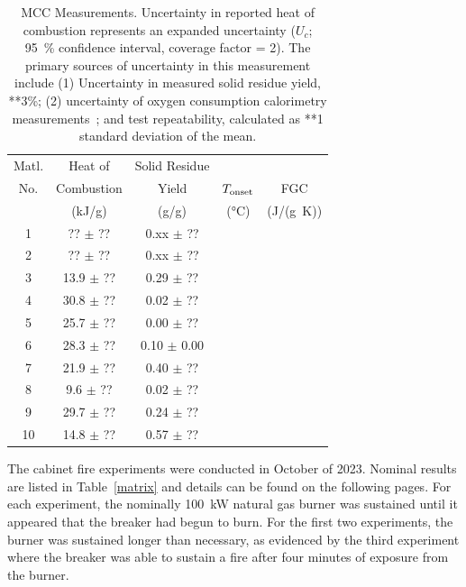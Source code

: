 \documentclass[12pt]{article}
\begin{document}
\begin{table}
\begin{center}
\caption[MCC Measurements]{MCC Measurements. Uncertainty in reported heat of combustion represents an expanded uncertainty ($U_c$; 95~\% confidence interval, coverage factor = 2).  The primary sources of uncertainty in this measurement include (1) Uncertainty in measured solid residue yield, **3\%; (2) uncertainty of oxygen consumption calorimetry measurements~\cite{Huggett:1}; and test repeatability, calculated as **1 standard deviation of the mean.}
\label{MCC}
\begin{tabular}{ccccc}
\hline
Matl.  & Heat of        & Solid Residue    & &                                 \\
No.    & Combustion     & Yield            & $T_{\rm onset}$    & FGC          \\
       & (kJ/g)         & (g/g)            & (°C)               & (J/(g~K))    \\
\hline
1      &  ?? $\pm$ ??   & 0.xx $\pm$ ??    &                    &              \\
2      &  ?? $\pm$ ??   & 0.xx $\pm$ ??    &                    &              \\
3      &  13.9 $\pm$ ?? & 0.29 $\pm$ ??    &                    &              \\
4      &  30.8 $\pm$ ?? & 0.02 $\pm$ ??    &                    &              \\
5      &  25.7 $\pm$ ?? & 0.00 $\pm$ ??    &                    &              \\
6      &  28.3 $\pm$ ?? & 0.10 $\pm$ 0.00  &                    &              \\
7      &  21.9 $\pm$ ?? & 0.40 $\pm$ ??    &                    &              \\
8      &  9.6 $\pm$ ??  & 0.02 $\pm$ ??    &                    &              \\
9      &  29.7 $\pm$ ?? & 0.24 $\pm$ ??    &                    &              \\
10     &  14.8 $\pm$ ?? & 0.57 $\pm$ ??    &                    &              \\
\hline
\end{tabular}
\end{center}
\end{table}


The cabinet fire experiments were conducted in October of 2023. Nominal results are listed in Table~\ref{matrix} and details can be found on the following pages. For each experiment, the nominally 100~kW natural gas burner was sustained until it appeared that the breaker had begun to burn. For the first two experiments, the burner was sustained longer than necessary, as evidenced by the third experiment where the breaker was able to sustain a fire after four minutes of exposure from the burner.
\end{document}
